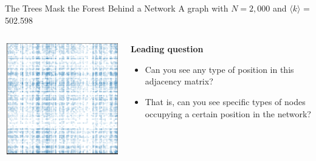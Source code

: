 \documentclass[notes, aspectratio=1610]{beamer}
\begin{document}
\begin{frame}{The Trees Mask the Forest Behind a Network}
	{A graph with $N = 2,000$ and $\langle k \rangle$ = 502.598 }
	\begin{columns}
		\begin{column}{0.5\textwidth}
			\centering 
			\includegraphics[]{images/random.pdf}

		\end{column}
		\begin{column}{0.3\textwidth}
			\textbf{Leading question}

			\begin{itemize}
				\item 
				Can you see any type of position in this 
				adjacency matrix?
				\item That is, can you see specific types of nodes 
				occupying a certain position in the network?
			\end{itemize}
		\end{column}
	\end{columns}
\end{frame}
\end{document}
